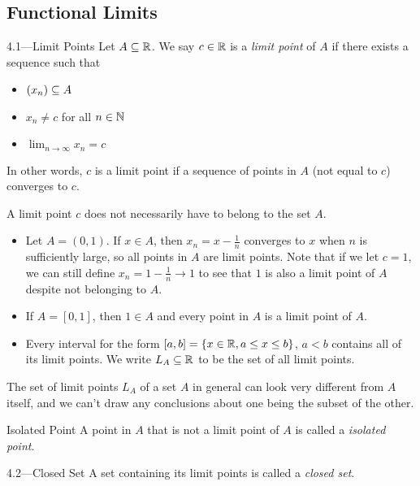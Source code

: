 \documentclass[class=article, crop=false]{standalone}
\begin{document}
  \subsection{Functional Limits}
  \begin{definition}{4.1---Limit Points}
    Let $A\subseteq \mathbb{R}$. We say $c\in\mathbb{R}$ is a \emph{limit point} of $A$ if there exists a sequence such that
    \begin{itemize}
      \item $(x_n)\subseteq A$
      \item $x_n\neq c$ for all $n\in\mathbb{N}$
      \item $\displaystyle\lim_{n\to \infty} x_n = c$
    \end{itemize}
    In other words, $c$ is a limit point if a sequence of points in $A$ (not equal to $c$) converges to $c$.
  \end{definition}
  \begin{note}{}
    A limit point $c$ does not necessarily have to belong to the set $A$.
  \end{note}
  \begin{example}{}
    \begin{itemize}
      \item Let $A = (0, 1)$. If $x\in A$, then $x_n = x - \frac{1}{n}$ converges to $x$ when $n$ is sufficiently large, so all points in $A$ are limit points. Note that if we let $c = 1$, we can still define $x_n = 1 - \frac{1}{n}\to 1$ to see that $1$ is also a limit point of $A$ despite not belonging to $A$.
      \item If $A = [0, 1]$, then $1\in A$ and every point in $A$ is a limit point of $A$.
      \item Every interval for the form $[a, b] = \left\{x\in\mathbb{R}, a\leq x\leq b\right\}$, $a < b$ contains all of its limit points. We write $L_A\subseteq\mathbb{R}$ to be the set of all limit points.
    \end{itemize}
  \end{example}
  \begin{note}{}
    The set of limit points $L_A$ of a set $A$ in general can look very different from $A$ itself, and we can't draw any conclusions about one being the subset of the other.
  \end{note}
  \begin{definition}{Isolated Point}
    A point in $A$ that is not a limit point of $A$ is called a \emph{isolated point}.
  \end{definition}
  \begin{definition}{4.2---Closed Set}
    A set containing its limit points is called a \emph{closed set}.
  \end{definition}
\end{document}
